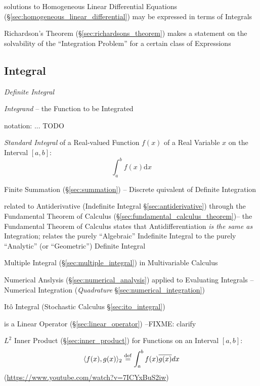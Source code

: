solutions to Homogeneous Linear Differential Equations
(\S\ref{sec:homogeneous_linear_differential}) may be expressed in
terms of Integrals

Richardson's Theorem (\S\ref{sec:richardsons_theorem}) makes a statement on the
solvability of the ``Integration Problem'' for a certain class of Expressions



\subsection{Integral}\label{sec:integral}

\emph{Definite Integral}

\emph{Integrand} -- the Function to be Integrated

notation:
... TODO

\emph{Standard Integral} of a Real-valued Function $f(x)$ of a Real Variable $x$
on the Interval $[a,b]$:
\[
  \int_a^b f(x) \mathrm{d}x
\]

\fist Finite Summation (\S\ref{sec:summation}) -- Discrete quivalent of
Definite Integration

\fist related to Antiderivative (Indefinite Integral \S\ref{sec:antiderivative})
through the Fundamental Theorem of Calculus
(\S\ref{sec:fundamental_calculus_theorem})--
the Fundamental Theorem of Calculus states that Antidifferentiation \emph{is the
  same as} Integration;
relates the purely ``Algebraic'' Indefinite Integral to the purely ``Analytic''
(or ``Geometric'') Definite Integral

\fist Multiple Integral (\S\ref{sec:multiple_integral}) in Multivariable
Calculus

\fist Numerical Anslysis (\S\ref{sec:numerical_analysis}) applied to Evaluating
Integrals -- Numerical Integration (\emph{Quadrature}
\S\ref{sec:numerical_integration})

\fist It\^o Integral (Stochastic Calculus \S\ref{sec:ito_integral})

is a Linear Operator (\S\ref{sec:linear_operator}) --FIXME: clarify

$L^2$ Inner Product (\S\ref{sec:inner_product}) for Functions on an Interval
$[a, b]$:
\[
  \langle{f(x), g(x)}\rangle_2 \stackrel{\mathrm{def}}= \int_a^b f(x) \overline{g(x)} dx
\]
(\url{https://www.youtube.com/watch?v=7ICYxBuS2iw})

